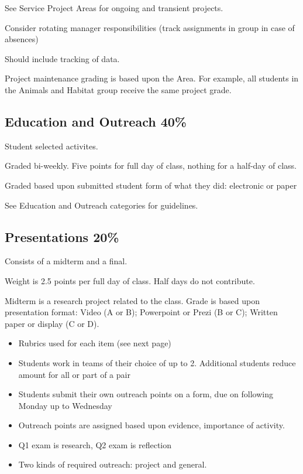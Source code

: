 \documentclass[letterpaper,10pt]{memoir}
\begin{document}
	See Service Project Areas for ongoing and transient projects.

	Consider rotating manager responsibilities (track assignments in group in case of absences)
	
	Should include tracking of data.

	Project maintenance grading is based upon the Area. For example, all students in the Animals and Habitat group receive the same project grade.


	\subsection*{Education and Outreach \hfill 40\%}

	Student selected activites.

	Graded bi-weekly. Five points for full day of class, nothing for a half-day of class.

	Graded based upon submitted student form of what they did: electronic or paper
	
	See Education and Outreach categories for guidelines.


	\subsection*{Presentations \hfill 20\%}

	Consists of a midterm and a final.
	
	Weight is 2.5 points per full day of class. Half days do not contribute.

	Midterm is a research project related to the class. Grade is based upon presentation format: Video (A or B); Powerpoint or Prezi (B or C); Written paper or display (C or D).



	\begin{itemize}
	\item Rubrics used for each item (see next page)
	\item Students work in teams of their choice of up to 2. Additional students reduce amount for all or part of a pair
	\item Students submit their own outreach points on a form, due on following Monday up to Wednesday
	\item Outreach points are assigned based upon evidence, importance of activity.
	\item Q1 exam is research, Q2 exam is reflection
	\item Two kinds of required outreach: project and general.
	\end{itemize}
\end{document}
